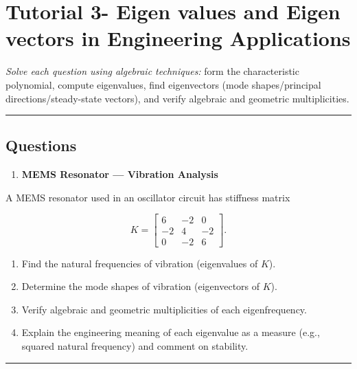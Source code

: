\documentclass[
  letterpaper,
  DIV=11,
  numbers=noendperiod]{scrreprt}
\providecommand{\tightlist}{%
  \setlength{\itemsep}{0pt}\setlength{\parskip}{0pt}}
\begin{document}
\section{Tutorial 3- Eigen values and Eigen vectors in Engineering
Applications}\label{tutorial-3--eigen-values-and-eigen-vectors-in-engineering-applications}

\emph{Solve each question using algebraic techniques:} form the
characteristic polynomial, compute eigenvalues, find eigenvectors (mode
shapes/principal directions/steady-state vectors), and verify algebraic
and geometric multiplicities.

\begin{center}\rule{0.5\linewidth}{0.5pt}\end{center}

\subsection{Questions}\label{questions}

\begin{enumerate}
\def\labelenumi{\arabic{enumi}.}
\tightlist
\item
  \textbf{MEMS Resonator --- Vibration Analysis}
\end{enumerate}

A MEMS resonator used in an oscillator circuit has stiffness matrix

\[K = \begin{bmatrix}6 & -2 & 0 \\ -2 & 4 & -2 \\ 0 & -2 & 6\end{bmatrix}.\]

\begin{enumerate}
\def\labelenumi{(\alph{enumi})}
\item
  Find the natural frequencies of vibration (eigenvalues of \(K\)).
\item
  Determine the mode shapes of vibration (eigenvectors of \(K\)).
\item
  Verify algebraic and geometric multiplicities of each eigenfrequency.
\item
  Explain the engineering meaning of each eigenvalue as a measure (e.g.,
  squared natural frequency) and comment on stability.
\end{enumerate}

\begin{center}\rule{0.5\linewidth}{0.5pt}\end{center}
\end{document}
